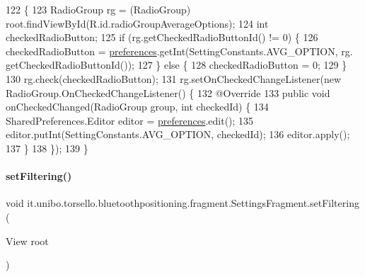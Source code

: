 \begin{DoxyCode}
122                                          \{
123         RadioGroup rg = (RadioGroup) root.findViewById(R.id.radioGroupAverageOptions);
124         \textcolor{keywordtype}{int} checkedRadioButton;
125         \textcolor{keywordflow}{if} (rg.getCheckedRadioButtonId() != 0) \{
126             checkedRadioButton = \hyperlink{classit_1_1unibo_1_1torsello_1_1bluetoothpositioning_1_1fragment_1_1SettingsFragment_a52480c4d5d81ca59fe4a98ae3c623ea4_a52480c4d5d81ca59fe4a98ae3c623ea4}{preferences}.getInt(SettingConstants.AVG\_OPTION, rg.
      getCheckedRadioButtonId());
127         \} \textcolor{keywordflow}{else} \{
128             checkedRadioButton = 0;
129         \}
130         rg.check(checkedRadioButton);
131         rg.setOnCheckedChangeListener(\textcolor{keyword}{new} RadioGroup.OnCheckedChangeListener() \{
132             @Override
133             \textcolor{keyword}{public} \textcolor{keywordtype}{void} onCheckedChanged(RadioGroup group, \textcolor{keywordtype}{int} checkedId) \{
134                 SharedPreferences.Editor editor = \hyperlink{classit_1_1unibo_1_1torsello_1_1bluetoothpositioning_1_1fragment_1_1SettingsFragment_a52480c4d5d81ca59fe4a98ae3c623ea4_a52480c4d5d81ca59fe4a98ae3c623ea4}{preferences}.edit();
135                 editor.putInt(SettingConstants.AVG\_OPTION, checkedId);
136                 editor.apply();
137             \}
138         \});
139     \}
\end{DoxyCode}
\hypertarget{classit_1_1unibo_1_1torsello_1_1bluetoothpositioning_1_1fragment_1_1SettingsFragment_a0d7b911602439aaf2a9ee4d5f9e41088_a0d7b911602439aaf2a9ee4d5f9e41088}{}\label{classit_1_1unibo_1_1torsello_1_1bluetoothpositioning_1_1fragment_1_1SettingsFragment_a0d7b911602439aaf2a9ee4d5f9e41088_a0d7b911602439aaf2a9ee4d5f9e41088} 
\paragraph{\texorpdfstring{set\+Filtering()}{setFiltering()}}
{\footnotesize\ttfamily void it.\+unibo.\+torsello.\+bluetoothpositioning.\+fragment.\+Settings\+Fragment.\+set\+Filtering (\begin{DoxyParamCaption}\item[{View}]{root }\end{DoxyParamCaption})\hspace{0.3cm}{\ttfamily [private]}}


